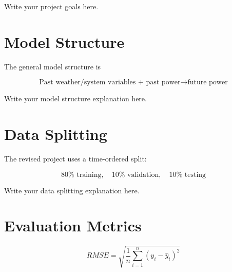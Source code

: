 \documentclass[11pt]{article}
\begin{document}
Write your project goals here.

\section{Model Structure}


The general model structure is

\[
\text{Past weather/system variables + past power} \rightarrow \text{future power}
\]

Write your model structure explanation here.

\section{Data Splitting}


The revised project uses a time-ordered split:

\[
80\% \text{ training}, \quad 10\% \text{ validation}, \quad 10\% \text{ testing}
\]

Write your data splitting explanation here.

\section{Evaluation Metrics}


\[
RMSE = \sqrt{\frac{1}{n}\sum_{i=1}^{n}(y_i-\hat{y}_i)^2}
\]
\end{document}
